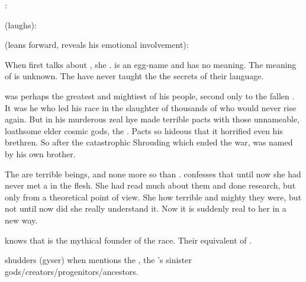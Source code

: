 \Teshrial:

\Urizeth (laughs): 

\Teshrial (leans forward, reveals his emotional involvement):

When \Urizeth first talks about \Ishnaruchaefir, she .
 is an egg-name and has no meaning.
The meaning of \quo{\Ishnaruchaefir} is unknown.
The \dragons have never taught the \resphain the secrets of their language.

\QuessanthIshnaruchaefir was perhaps the greatest and mightiest of his people, second only to the fallen \Nexagglachel. 
It was he who led his race in the slaughter of thousands of \resphain who would never rise again. 
But in his murderous zeal hye made terrible pacts with those unnameable, loathsome elder cosmic gods, the \xss. 
Pacts so hideous that it horrified even his brethren.
So after the catastrophic Shrouding which ended the war, \Ishnaruchaefir was named  by his own brother. 

The \dragons are terrible beings, and none more so than \Ishnaruchaefir.
\Urizeth confesses that until now she had never met a \dragon in the flesh.
She had read much about them and done research, but only from a theoretical point of view. 
She  how terrible and mighty they were, but not until now did she really understand it.
Now it is suddenly real to her in a new way. 


\Teshrial knows that \Sethicus is the mythical founder of the \draconic race.
Their equivalent of \Thanatzil.

\Teshrial shudders (gyser) when \Urizeth mentions the \SitraAchras, the \resphain's sinister gods/creators/progenitors/ancestors.

